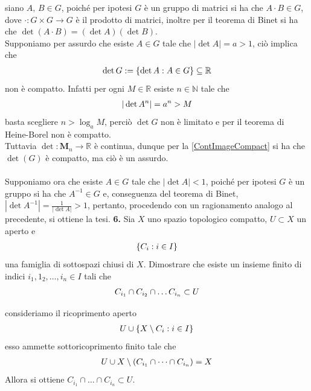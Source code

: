 \documentclass[oneside, 11pt]{amsbook}
\makeatletter
\newcommand{\0}{{(0)}}
\newcommand{\3}{{(3)}}
\theoremstyle{colonplain}
\theoremstyle{colondefinition}
\theoremstyle{colonremark}
\numberwithin{equation}{chapter}
\renewcommand{\proofname}{Dimostrazione}
\renewenvironment{proof}[1][\proofname]{\par
  \pushQED{\qed}%
  \normalfont \topsep6\p@\@plus6\p@\relax
  \trivlist
  \item[\hskip\labelsep\bfseries #1:]\ignorespaces
}{%
  \popQED\endtrivlist\@endpefalse
}
\makeatother
\begin{document}
\begin{proof}
siano $A,\, B \in G$, poiché per ipotesi $G$ è un gruppo di matrici si ha che $A \cdot B \in G$, dove $\cdot : G \times G \longrightarrow G$ è il prodotto di matrici, inoltre per il teorema di Binet si ha che $\det (A \cdot B) = (\det A)(\det B)$. \\
Supponiamo per assurdo che esiste $A \in G$ tale che $|\det A| = a > 1$, ciò implica che
\begin{align}
    \det G := \{ \det A : A \in G \} \subseteq \mathbb{R} \notag
\end{align}
non è compatto. Infatti per ogni $M \in \mathbb{R}$ esiste $n \in \mathbb{N}$ tale che
\begin{align}
    |\det A^n| = a^n > M \notag
\end{align}
basta scegliere $n > \log_a M$, perciò $\det G$ non è limitato e per il teorema di Heine-Borel non è compatto. \\
Tuttavia $\det : \mathbf{M}_n \longrightarrow \mathbb{R}$ è continua, dunque per la \cref{ContImageCompact} si ha che $\det(G)$ è compatto, ma ciò è un assurdo. \\ \\
Supponiamo ora che esiste $A \in G$ tale che $|\det A| < 1$, poiché per ipotesi $G$ è un gruppo si ha che $A^{-1} \in G$ e, conseguenza del teorema di Binet, $|\det A^{-1}| = \frac{1}{|\det A|} > 1$, pertanto, procedendo con un ragionamento analogo al precedente, si ottiene la tesi.
\end{proof}
\textbf{6.} Sia $X$ uno spazio topologico compatto, $U \subset X$ un aperto e
\begin{align}
    \{ C_i : i \in I \} \notag
\end{align}
una famiglia di sottospazi chiusi di $X$. Dimostrare che esiste un insieme finito di indici $i_1, 1_2, \dots, i_n \in I$ tali che
\begin{align}
    C_{i_1} \cap C_{i_2} \cap \dots C_{i_n} \subset U \notag
\end{align}
\begin{proof}
consideriamo il ricoprimento aperto
\begin{align}
    U \cup \{ X \setminus C_i : i \in I \} \notag
\end{align}
esso ammette sottoricoprimento finito tale che
\begin{align}
    U \cup X \setminus (C_{i_1} \cap \dots \cap C_{i_n}) = X \notag
\end{align}
Allora si ottiene $C_{i_1} \cap \dots \cap C_{i_n} \subset U$.
\end{proof}
\end{document}
